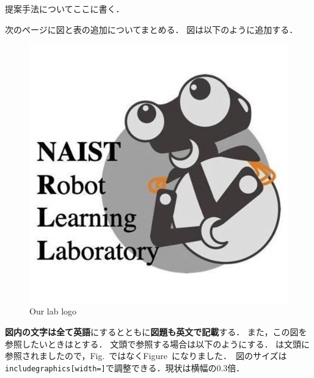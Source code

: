 提案手法についてここに書く．

\vspace{10truemm}
次のページに図と表の追加についてまとめる．
\newpage
図は以下のように追加する．
\begin{figure}[t]
    \centering
    \includegraphics[clip, width=0.3\linewidth]{figures/rll_logo.png}
    \caption{Our lab logo}
    \label{fig: our_logo}
\end{figure}

{\bf 図内の文字は全て英語}にするとともに{\bf 図題も英文で記載}する．
また，この図を参照したいときはとする．
文頭で参照する場合は以下のようにする．
は文頭に参照されましたので，Fig.~ではなくFigure~になりました．\
図のサイズは\texttt{includegraphics[width=]}で調整できる．現状は横幅の$0.3$倍．

